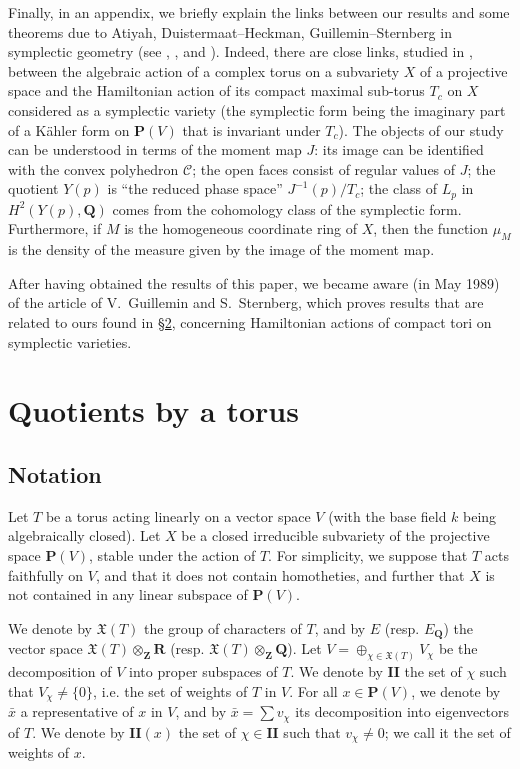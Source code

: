 \documentclass{article}
\theoremstyle{plain}
\theoremstyle{definition}
\newcommand{\PP}{\mathbf{P}}
\newcommand{\QQ}{\mathbf{Q}}
\newcommand{\ZZ}{\mathbf{Z}}
\newcommand{\RR}{\mathbf{R}}
\newcommand{\II}{\mathbf{II}}
\newcommand{\oldpage}[1]{\marginpar{\footnotesize$\Big\vert$ \textit{p.~#1}}}
\begin{document}
Finally, in an appendix, we briefly explain the links between our results and some theorems due to Atiyah, Duistermaat--Heckman, Guillemin--Sternberg in symplectic geometry (see \cite{Ati}, \cite{DH12}, and \cite{GS12}).
Indeed, there are close links, studied in \cite{Kir}, between the algebraic action of a complex torus on a subvariety $X$ of a projective space and the Hamiltonian action of its compact maximal sub-torus $T_c$ on $X$ considered as a symplectic variety (the symplectic form being the imaginary part of a K\"{a}hler form on $\PP(V)$ that is invariant under $T_c$).
The objects of our study can be understood in terms of the moment map $J$:
its image can be identified with the convex polyhedron $\mathcal{C}$;
the open faces consist of regular values of $J$;
the quotient $Y(p)$ is ``the reduced phase space'' $J^{-1}(p)/T_c$;
the class of $L_p$ in $H^2(Y(p),\QQ)$ comes from the cohomology class of the symplectic form.
Furthermore, if $M$ is the homogeneous coordinate ring of $X$, then the function $\mu_M$ is the density of the measure given by the image of the moment map.

After having obtained the results of this paper, we became aware (in May 1989) of the article \cite{GS3} of V.~Guillemin and S.~Sternberg, which proves results that are related to ours found in \hyperref[2]{\S2}, concerning Hamiltonian actions of compact tori on symplectic varieties.


\section{Quotients by a torus}
\label{1}

\subsection{Notation}
\label{1.1}

Let $T$ be a torus acting linearly on a vector space $V$ (with the base field $k$ being algebraically closed).
Let $X$ be a closed irreducible subvariety of the projective space $\PP(V)$, stable under the action of $T$.
For simplicity, we suppose
\oldpage{512}
that $T$ acts faithfully on $V$, and that it does not contain homotheties, and further that $X$ is not contained in any linear subspace of $\PP(V)$.

We denote by $\mathfrak{X}(T)$ the group of characters of $T$, and by $E$ (resp. $E_\QQ$) the vector space $\mathfrak{X}(T)\otimes_\ZZ\RR$ (resp. $\mathfrak{X}(T)\otimes_\ZZ\QQ$).
Let $V=\oplus_{\chi\in\mathfrak{X}(T)}V_\chi$ be the decomposition of $V$ into proper subspaces of $T$.
We denote by $\II$ the set of $\chi$ such that $V_\chi\neq\{0\}$, i.e. the set of weights of $T$ in $V$.
For all $x\in\PP(V)$, we denote by $\bar{x}$ a representative of $x$ in $V$, and by $\bar{x}=\sum v_\chi$ its decomposition into eigenvectors of $T$.
We denote by $\II(x)$ the set of $\chi\in\II$ such that $v_\chi\neq0$;
we call it the set of weights of $x$.
\end{document}
